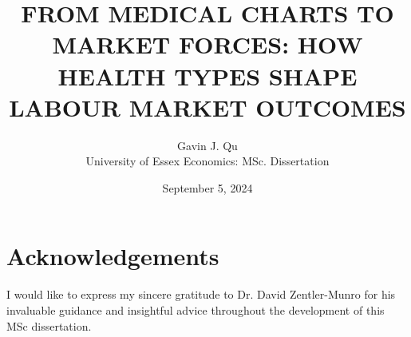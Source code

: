 \documentclass[12pt]{article}
\title{FROM MEDICAL CHARTS TO MARKET FORCES: HOW HEALTH TYPES SHAPE LABOUR MARKET OUTCOMES}
\author{Gavin J. Qu\\University of Essex Economics: MSc. Dissertation}
\date{September 5, 2024}
\begin{document}
\maketitle

\section*{Acknowledgements}
I would like to express my sincere gratitude to Dr. David Zentler-Munro for his invaluable guidance and insightful advice throughout the development of this MSc dissertation.



\tableofcontents
\newpage










\nocite{athey2019,ryff2005}


\end{document}
